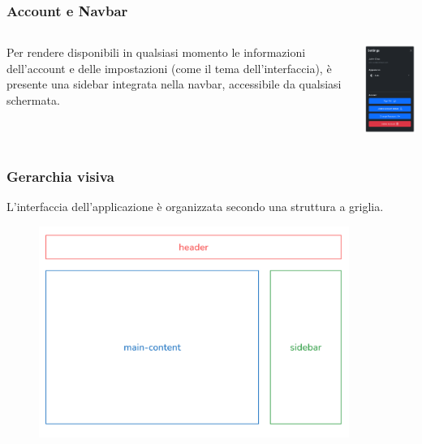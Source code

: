 \documentclass{beamer}
\begin{document}
\begin{frame}
  \frametitle{Account e Navbar}

  \begin{columns}
    \begin{column}{0.53\textwidth}
      Per rendere disponibili in qualsiasi momento le informazioni dell’account e delle impostazioni (come il tema dell’interfaccia), è presente una sidebar integrata nella navbar, accessibile da qualsiasi schermata.
    \end{column}
    \begin{column}{0.48\textwidth}
      \includegraphics[width=5cm]{sidebar.png}
    \end{column}
  \end{columns}
\end{frame}

\begin{frame}
  \frametitle{Gerarchia visiva}

  L’interfaccia dell’applicazione è organizzata secondo una struttura a griglia.

  \begin{figure}
    \includegraphics[width=0.9\textwidth]{gerarchia_visiva.png}
  \end{figure}
\end{frame}
\end{document}
